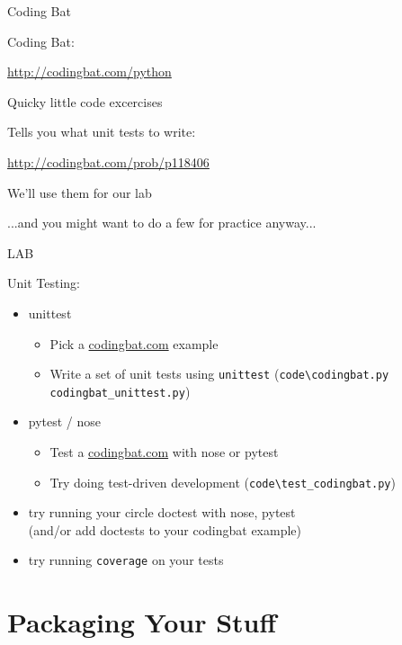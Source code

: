 \documentclass{beamer}
\begin{document}
\begin{frame}[fragile]{Coding Bat}

{\LARGE Coding Bat:}

\url{http://codingbat.com/python}

\vfill
{\Large Quicky little code excercises}

\vfill
{\Large Tells you what unit tests to write:}

\url{http://codingbat.com/prob/p118406}

\vfill
{\Large We'll use them for our lab}

\vfill
{\large ...and you might want to do a few for practice anyway...}

\end{frame}

\begin{frame}[fragile]{LAB}

{\Large Unit Testing:}

\begin{itemize}
  \item unittest
    \begin{itemize}
       \item Pick a \url{codingbat.com} example
       \item Write a set of unit tests using \verb|unittest|
         (\verb|code\codingbat.py  codingbat_unittest.py|)
    \end{itemize}
  \item pytest / nose
    \begin{itemize}
       \item Test a \url{codingbat.com} with nose or pytest
       \item Try doing test-driven development
         (\verb|code\test_codingbat.py|)
    \end{itemize}

  \item try running your circle doctest with nose, pytest\\
        (and/or add doctests to your codingbat example)
  \item try running \verb|coverage| on your tests
\end{itemize}

\end{frame}

\section{Packaging Your Stuff}
\end{document}
